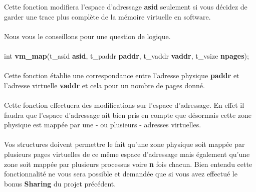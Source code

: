 \documentclass[10pt,a4wide]{article}
\begin{document}
Cette fonction modifiera l'espace d'adressage \textbf{asid} seulement si
vous d\'ecidez de garder une trace plus compl\`ete de la m\'emoire virtuelle
en software.

\paragraph{}

Nous vous le conseillons pour une question de logique.

\paragraph{}

\hspace{1.5cm}int \textbf{vm\_map}(t\_asid \textbf{asid},
				   t\_paddr \textbf{paddr},
                                   t\_vaddr \textbf{vaddr},
                                   t\_vsize \textbf{npages});

\paragraph{}

Cette fonction \'etablie une correspondance entre l'adresse physique
\textbf{paddr} et l'adresse virtuelle \textbf{vaddr} et cela pour
un nombre de pages donn\'e.

\paragraph{}

Cette fonction effectuera des modifications sur l'espace d'adressage.
En effet il faudra que l'espace d'adressage ait bien pris en compte que
d\'esormais cette zone physique est mapp\'ee par une - ou plusieurs -
adresses virtuelles.

\paragraph{}

Vos structures doivent permettre le fait qu'une zone physique soit mapp\'ee
par plusieurs pages virtuelles de ce m\^eme espace d'adressage mais \'egalement
qu'une zone soit mapp\'ee par plusieurs processus voire \textbf{n} fois
chacun. Bien entendu cette fonctionnalit\'e ne vous sera possible et demand\'ee
que si vous avez effectu\'e le bonus \textbf{Sharing} du projet pr\'ec\'edent.

\paragraph{}
\end{document}
